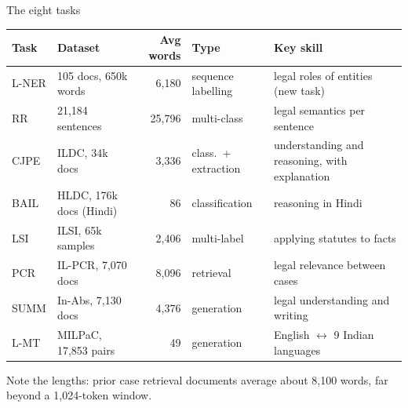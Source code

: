 \documentclass[aspectratio=169,11pt]{beamer}
\begin{document}
\begin{frame}{The eight tasks}
  \footnotesize
  \begin{tabularx}{\textwidth}{@{}llrlX@{}}
    \toprule
    Task & Dataset & Avg words & Type & Key skill\\
    \midrule
    L-NER & 105 docs, 650k words & 6,180 & sequence labelling & legal roles of entities (new task)\\
    RR & 21,184 sentences & 25,796 & multi-class & legal semantics per sentence\\
    CJPE & ILDC, 34k docs & 3,336 & class.\ + extraction & understanding and reasoning, with explanation\\
    BAIL & HLDC, 176k docs (Hindi) & 86 & classification & reasoning in Hindi\\
    LSI & ILSI, 65k samples & 2,406 & multi-label & applying statutes to facts\\
    PCR & IL-PCR, 7,070 docs & 8,096 & retrieval & legal relevance between cases\\
    SUMM & In-Abs, 7,130 docs & 4,376 & generation & legal understanding and writing\\
    L-MT & MILPaC, 17,853 pairs & 49 & generation & English $\leftrightarrow$ 9 Indian languages\\
    \bottomrule
  \end{tabularx}
  \vspace{2mm}

  \small
  Note the lengths: prior case retrieval documents average about 8,100 words, far beyond a 1,024-token window.
\end{frame}
\end{document}
